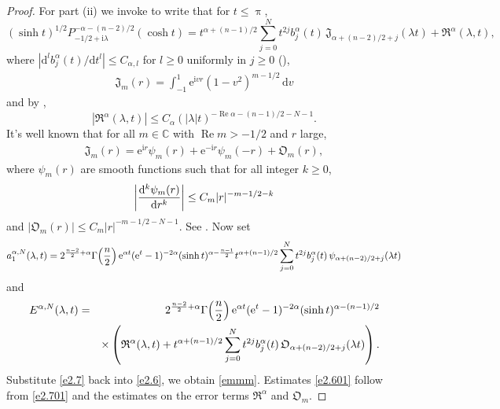 \documentclass[11pt]{amsproc}
\newcommand{\e}{\mathrm{e}}
\newcommand{\0}{\mathbf{0}}
\newcommand{\J}{\mathfrak{J}}
\newcommand{\CC}{\mathbb{C}}
\renewcommand{\Re}{\mathop{\mathrm{Re}}}
\renewcommand{\i}{\mathrm{i}}
\renewcommand{\d}{\mathrm{d}}
\numberwithin{equation}{section}
\numberwithin{figure}{section}
\theoremstyle{definition}
\theoremstyle{remark}
\numberwithin{thm}{section}
\begin{document}
\begin{proof}
For part (ii) we invoke \cite[(2.4.1(5))]{Sc} to write that for $t\leq \uppi$,
\begin{equation} \label{e2.7}
(\sinh t)^{1/2}P_{-1/2+\i\lambda}^{-\alpha-(n-2)/2}(\cosh t)
=t^{\alpha+(n-1)/2}\sum_{j=0}^N
t^{2j}b^\alpha_j(t)\,\J_{\alpha+(n-2)/2+j}(\lambda t)+ {\mathfrak R}^\alpha(\lambda,t),
\end{equation}
where    $|\d^l b^\alpha_j(t)/\d t^l|\leq C_{\alpha,l}$ for $l\geq 0$ uniformly in $j\geq 0$
(\cite[(2.4.1(4))]{Sc}),
\begin{eqnarray*}
\J_m(r)=\int_{-1}^1\e^{\i vr}(1-v^2)^{m-1/2}\,\d v
\end{eqnarray*}
and by \cite[(2.4.2(9))]{Sc},
$$
|{\mathfrak R}^\alpha(\lambda,t)|\leq C_{\alpha}(|\lambda|t)^{-\Re \alpha-(n-1)/2-N-1}.
$$
It's well known that for all $m\in \CC$ with $\Re m>-1/2$ and $r$ large,
\begin{eqnarray*}
\J_m(r)=\e^{\i r}\psi_m(r)+\e^{-\i r}\psi_m(-r)+ {\mathfrak O}_m(r),
\end{eqnarray*}
where $\psi_m(r)$ are smooth functions such that for all integer $k\geq 0$,
\begin{eqnarray}\label{e2.701}
\left|{\d^k\psi_m(r)\over\d r^k}\right|\leq C_m|r|^{-m-1/2-k}
\end{eqnarray}
and $|{\mathfrak O}_m(r)|\leq C_m|r|^{-m-1/2-N-1}$. See \cite[p. 51]{Io}.
Now set
\begin{equation}\label{e2.702}
a^{\alpha,N}_1(\lambda,t)=2^{{n-2\over 2}+\alpha}  \Gamma\! \left({n\over 2}\right)\e^{\alpha t}(\e^t -1)^{-2\alpha } (\sinh t)^{\alpha-{n-1\over 2}}t^{\alpha+(n-1)/2}\sum_{j=0}^Nt^{2j}b^\alpha_j(t)\,\psi_{\alpha+(n-2)/2+j}(\lambda t)
\end{equation}
and
\begin{eqnarray*}
E^{\alpha,N}(\lambda,t) &=& 2^{{n-2\over 2}+\alpha}  \Gamma\! \left({n\over 2}\right)\e^{\alpha t}(\e^t -1)^{-2\alpha } (\sinh t)^{\alpha-(n-1)/2}\\
&&\times
\left({\mathfrak R}^\alpha(\lambda,t)+t^{\alpha+(n-1)/2}\sum_{j=0}^Nt^{2j}b^\alpha_j(t)\,\mathfrak{O}_{\alpha+(n-2)/2+j}(\lambda t)\right).
\end{eqnarray*}
Substitute  \eqref{e2.7}  back into \eqref{e2.6}, we obtain \eqref{emmm}. Estimates \eqref{e2.601} follow from \eqref{e2.701} and the estimates on the error terms ${\mathfrak R}^\alpha$ and ${\mathfrak O}_m$.


\end{proof}
\end{document}
